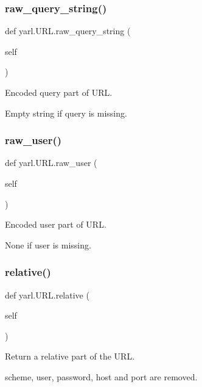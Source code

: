 \subsubsection{\texorpdfstring{raw\+\_\+query\+\_\+string()}{raw\_query\_string()}}
{\footnotesize\ttfamily def yarl.\+U\+R\+L.\+raw\+\_\+query\+\_\+string (\begin{DoxyParamCaption}\item[{}]{self }\end{DoxyParamCaption})}

\begin{DoxyVerb}Encoded query part of URL.

Empty string if query is missing.\end{DoxyVerb}
 \mbox{\label{classyarl_1_1_u_r_l_aebb2d210fe53976ee878560d86a0061a}} 
\subsubsection{\texorpdfstring{raw\+\_\+user()}{raw\_user()}}
{\footnotesize\ttfamily def yarl.\+U\+R\+L.\+raw\+\_\+user (\begin{DoxyParamCaption}\item[{}]{self }\end{DoxyParamCaption})}

\begin{DoxyVerb}Encoded user part of URL.

None if user is missing.\end{DoxyVerb}
 \mbox{\label{classyarl_1_1_u_r_l_aa009b6726f5eaa1eef87e4bcafe03518}} 
\subsubsection{\texorpdfstring{relative()}{relative()}}
{\footnotesize\ttfamily def yarl.\+U\+R\+L.\+relative (\begin{DoxyParamCaption}\item[{}]{self }\end{DoxyParamCaption})}

\begin{DoxyVerb}Return a relative part of the URL.

scheme, user, password, host and port are removed.\end{DoxyVerb}
 \mbox{\label{classyarl_1_1_u_r_l_a8b60f8bedeae832f0a6b829d51f67d72}} 

